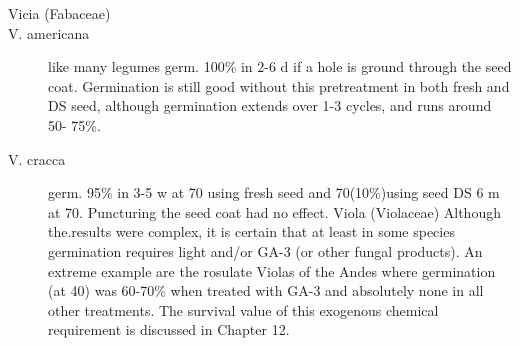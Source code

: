 \begin{description}
\item[Vicia (Fabaceae)]
\item[V. americana] like many legumes germ. 100\% in 2-6 d if a hole is ground
through the seed coat. Germination is still good without this pretreatment in both fresh
and DS seed, although germination extends over 1-3 cycles, and runs around 50-
75\%.
\item[V. cracca] germ. 95\% in 3-5 w at 70 using fresh seed and 70(10\%)using seed
DS 6 m at 70. Puncturing the seed coat had no effect.
Viola (Violaceae) Although the.results were complex, it is certain that at
least in some species germination requires light and/or GA-3 (or other fungal
products). An extreme example are the rosulate Violas of the Andes where
germination (at 40) was 60-70\% when treated with GA-3 and absolutely none in all
other treatments. The survival value of this exogenous chemical requirement is
discussed in Chapter 12.


\end{description}
